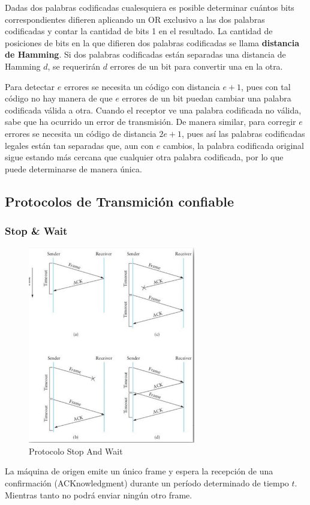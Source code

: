 Dadas dos palabras codificadas cualesquiera es posible determinar cuántos bits correspondientes difieren aplicando un OR exclusivo a las dos palabras codificadas y contar la cantidad de bits 1 en el resultado. La cantidad de posiciones de bits en la que difieren dos palabras codificadas se llama \textbf{distancia de Hamming}. Si dos palabras codificadas están separadas una distancia de Hamming \(d\), se requerirán \(d\) errores de un bit para convertir una en la otra.  

Para detectar \(e\) errores se necesita un código con distancia \(e + 1\), pues con tal código no hay manera de que \(e\) errores de un bit puedan cambiar una palabra codificada válida a otra. Cuando el receptor ve una palabra codificada no válida, sabe que ha ocurrido un error de transmisión. De manera similar, para corregir \(e\) errores se necesita un código de distancia \(2e + 1\), pues así las palabras codificadas legales están tan separadas que, aun con \(e\) cambios, la palabra codificada original sigue estando más cercana que cualquier otra palabra codificada, por lo que puede determinarse de manera única. 

\subsection{Protocolos de Transmición confiable}
\subsubsection{Stop \& Wait}
\begin{figure}[H]
	\centering
	\includegraphics[width=0.65\textwidth
]{images/stop-wait.png}
	\caption[Protocolo Stop And Wait]{Protocolo Stop And Wait}
	\label{fig:stop-wait}
\end{figure}
La máquina de origen emite un único frame y espera la recepción de una confirmación (ACKnowledgment) durante un período determinado de tiempo \(t\). Mientras tanto no podrá enviar ningún otro frame.


